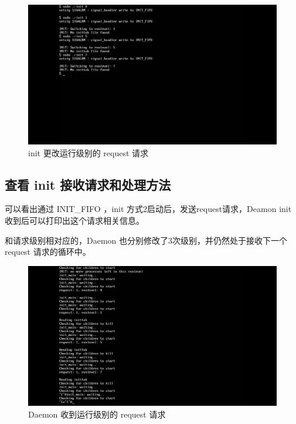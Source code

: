 \begin{figure}[htbp]
\centering
\includegraphics{./pictures/switch-to-runlevels.png}
\caption{init 更改运行级别的 request 请求}
\end{figure}

\subsection{查看 init 接收请求和处理方法}

可以看出通过 INIT\_FIFO ，init 方式2启动后，发送request请求，Deamon init
收到后可以打印出这个请求相关信息。

和请求级别相对应的，Daemon 也分别修改了3次级别，并仍然处于接收下一个
request 请求的循环中。

\begin{figure}[htbp]
\centering
\includegraphics{./pictures/init-daemon-trans.png}
\caption{Daemon 收到运行级别的 request 请求}
\end{figure}

